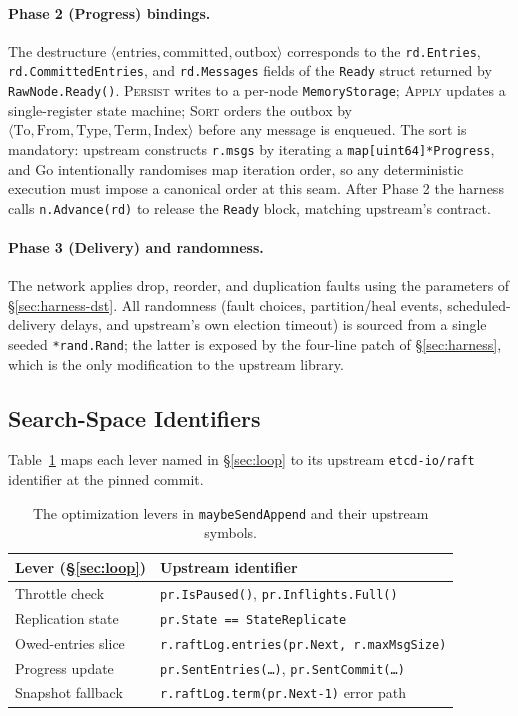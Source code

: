 \documentclass{article}
\begin{document}
\paragraph{Phase 2 (Progress) bindings.}
The destructure
$\langle\text{entries},\text{committed},\text{outbox}\rangle$
corresponds to the \texttt{rd.Entries}, \texttt{rd.CommittedEntries},
and \texttt{rd.Messages} fields of the \texttt{Ready} struct returned
by \texttt{RawNode.Ready()}. \textsc{Persist} writes to a per-node
\texttt{MemoryStorage}; \textsc{Apply} updates a single-register
state machine; \textsc{Sort} orders the outbox by
$\langle\text{To},\text{From},\text{Type},\text{Term},\text{Index}\rangle$
before any message is enqueued. The sort is mandatory: upstream
constructs \texttt{r.msgs} by iterating a
\texttt{map[uint64]*Progress}, and Go intentionally randomises map
iteration order, so any deterministic execution must impose a
canonical order at this seam. After Phase 2 the harness calls
\texttt{n.Advance(rd)} to release the \texttt{Ready} block, matching
upstream's contract.

\paragraph{Phase 3 (Delivery) and randomness.}
The network applies drop, reorder, and duplication faults using the
parameters of \S\ref{sec:harness-dst}. All randomness (fault
choices, partition/heal events, scheduled-delivery delays, and
upstream's own election timeout) is sourced from a single seeded
\texttt{*rand.Rand}; the latter is exposed by the four-line patch of
\S\ref{sec:harness}, which is the only modification to the upstream
library.

\subsection{Search-Space Identifiers}
\label{app:search-identifiers}
Table~\ref{tab:levers} maps each lever named in \S\ref{sec:loop} to its
upstream \texttt{etcd-io/raft} identifier at the pinned commit.

\begin{table}[h]
  \caption{The optimization levers in \texttt{maybeSendAppend} and
    their upstream symbols.}
  \label{tab:levers}
  \centering
  \begin{tabular}{ll}
    \toprule
    Lever (\S\ref{sec:loop}) & Upstream identifier \\
    \midrule
    Throttle check     & \texttt{pr.IsPaused()}, \texttt{pr.Inflights.Full()} \\
    Replication state  & \texttt{pr.State == StateReplicate} \\
    Owed-entries slice & \texttt{r.raftLog.entries(pr.Next, r.maxMsgSize)} \\
    Progress update    & \texttt{pr.SentEntries(\ldots)}, \texttt{pr.SentCommit(\ldots)} \\
    Snapshot fallback  & \texttt{r.raftLog.term(pr.Next-1)} error path \\
    \bottomrule
  \end{tabular}
\end{table}
\end{document}
